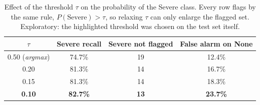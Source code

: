 \begin{table}[!t]
\centering
\caption{Effect of the threshold $\tau$ on the probability of the Severe class. Every row flags by the same rule, $P(\text{Severe}) > \tau$, so relaxing $\tau$ can only enlarge the flagged set. Exploratory: the highlighted threshold was chosen on the test set itself.}
\label{tab:limiar-teste}
\begin{tabular}{cccc}
\toprule
$\tau$ & Severe recall & Severe not flagged & False alarm on None \\
\midrule
0.50 (\emph{argmax}) & 74.7\% & 19 & 12.4\% \\
0.20 & 81.3\% & 14 & 16.7\% \\
0.15 & 81.3\% & 14 & 18.3\% \\
\textbf{0.10} & \textbf{82.7\%} & \textbf{13} & \textbf{23.7\%} \\
\bottomrule
\end{tabular}
\end{table}
